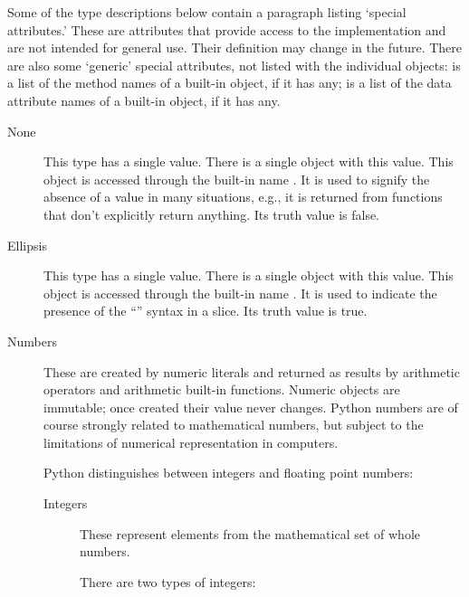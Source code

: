 Some of the type descriptions below contain a paragraph listing
`special attributes.'  These are attributes that provide access to the
implementation and are not intended for general use.  Their definition
may change in the future.  There are also some `generic' special
attributes, not listed with the individual objects: 
is a list of the method names of a built-in object, if it has any;
 is a list of the data attribute names of a built-in
object, if it has any.

\begin{description}

\item[None]
This type has a single value.  There is a single object with this value.
This object is accessed through the built-in name .
It is used to signify the absence of a value in many situations, e.g.,
it is returned from functions that don't explicitly return anything.
Its truth value is false.

\item[Ellipsis]
This type has a single value.  There is a single object with this value.
This object is accessed through the built-in name .
It is used to indicate the presence of the ``'' syntax in a
slice.  Its truth value is true.

\item[Numbers]
These are created by numeric literals and returned as results by
arithmetic operators and arithmetic built-in functions.  Numeric
objects are immutable; once created their value never changes.  Python
numbers are of course strongly related to mathematical numbers, but
subject to the limitations of numerical representation in computers.

Python distinguishes between integers and floating point numbers:

\begin{description}
\item[Integers]
These represent elements from the mathematical set of whole numbers.

There are two types of integers:

\begin{description}


\end{description}
\end{description}
\end{description}
